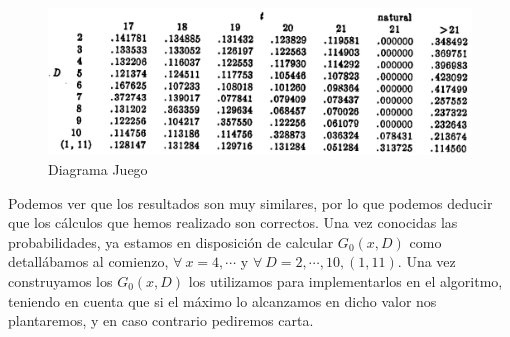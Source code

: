 \documentclass[12pt,a4paper,]{book}
\numberwithin{dummy}{section}
\theoremstyle{ocrenumbox}
\theoremstyle{blacknumex}
\theoremstyle{blacknumbox}
\theoremstyle{ocrenum}
\theoremstyle{ocrenum}
\begin{document}
\begin{figure}[H]

{\centering \includegraphics[width=0.8\linewidth]{tabla_probabilidades_baldwin} 

}

\caption{\label{forma_extensiva}Diagrama Juego}\label{fig:ingles_blackjack}
\end{figure}

Podemos ver que los resultados son muy similares, por lo que podemos
deducir que los cálculos que hemos realizado son correctos. Una vez
conocidas las probabilidades, ya estamos en disposición de calcular
\(G_0(x,D)\) como detallábamos al comienzo, \(\forall \ x=4,\cdots\) y
\(\forall \  D=2,\cdots,10,(1,11)\). Una vez construyamos los
\(G_0(x,D)\) los utilizamos para implementarlos en el algoritmo,
teniendo en cuenta que si el máximo lo alcanzamos en dicho valor nos
plantaremos, y en caso contrario pediremos carta.

\begingroup\fontsize{12}{14}\selectfont
\end{document}
